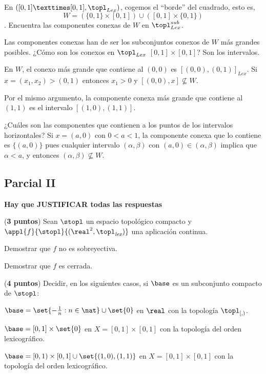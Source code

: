 \begin{problem} En $([0,1]×[0,1], \topl_{Lex})$, cogemos el ``borde'' del cuadrado, esto es, \[W = \left(\{0,1\} × [0,1]\right) ∪ \left([0,1] × \{0,1\}\right) \]. Encuentra las componentes conexas de $W$ en $\topl_{Lex}^{sub}$.
\solution

Las componentes conexas han de ser los subconjuntos conexos de $W$ más grandes posibles. ¿Cómo son los conexos en $\topl_{Lex}$ $[0,1]×[0,1]$? Son los intervalos.

En $W$, el conexo más grande que contiene al $(0,0)$ es $[(0,0), (0,1)]_{Lex}$. Si $x = (x_1, x_2) > (0,1)$ entonces $x_1 > 0$ y $[(0,0), x] \nsubseteq W$.

Por el mismo argumento, la componente conexa más grande que contiene al $(1,1)$ es el intervalo $[(1,0), (1,1)]$.

¿Cuáles son las componentes que contienen a los puntos de los intervalos horizontales? Si $x = (a,0)$ con $0<a<1$, la componente conexa que lo contiene es $\{(a,0)\}$ pues cualquier intervalo $(α,β)$ con $(a,0) ∈ (α,β)$ implica que $α < a$, y entonces $(α,β) \nsubseteq W$.
\end{problem}


\newpage
\subsection{Parcial II}
{\bf Hay que JUSTIFICAR todas las respuestas}

\begin{problem} ({\bf 3 puntos}) Sean $\stopl$ un espacio topológico compacto y $\appl{f}{\stopl}{(\real^2, \topl_{\textit{lex}})}$ una aplicación continua.

\ppart Demostrar que $f$ no es sobreyectiva.

\ppart Demostrar que $f$ es cerrada.

\solution
\end{problem}


\begin{problem} ({\bf 4 puntos}) Decidir, en los siguientes casos, si $\base$ es un subconjunto compacto de $\stopl$:

\ppart ${\base = \set{-\frac{1}{n} : n \in \nat} \cup \set{0}}$ en $\real$ con la topología $\topl_{[,)}$.

\ppart ${\base = [0,1] \times \set{0} }$ en ${X = [0,1] \times [0,1] }$ con la topología del orden lexicográfico.

\ppart ${\base = [0,1) \times [0,1] \cup \set{(1,0), (1,1)} }$ en ${X = [0,1] \times [0,1] }$ con la topología del orden lexicográfico.

\solution
\end{problem}


